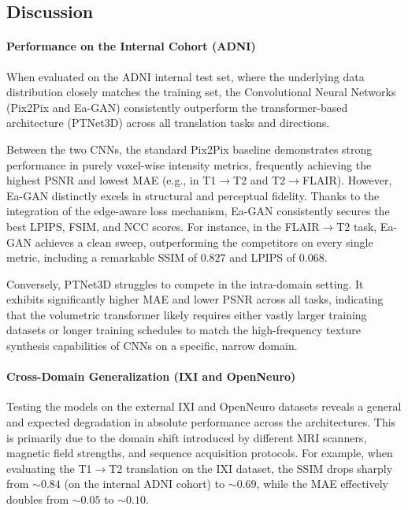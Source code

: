 \documentclass[11pt,a4paper]{article}
\begin{document}
\subsection{Discussion}

\paragraph{Performance on the Internal Cohort (ADNI)}
When evaluated on the ADNI internal test set, where the underlying data distribution closely matches the training set, the Convolutional Neural Networks (Pix2Pix and Ea-GAN) consistently outperform the transformer-based architecture (PTNet3D) across all translation tasks and directions. 

Between the two CNNs, the standard Pix2Pix baseline demonstrates strong performance in purely voxel-wise intensity metrics, frequently achieving the highest PSNR and lowest MAE (e.g., in T1$\rightarrow$T2 and T2$\rightarrow$FLAIR). However, Ea-GAN distinctly excels in structural and perceptual fidelity. Thanks to the integration of the edge-aware loss mechanism, Ea-GAN consistently secures the best LPIPS, FSIM, and NCC scores. For instance, in the FLAIR$\rightarrow$T2 task, Ea-GAN achieves a clean sweep, outperforming the competitors on every single metric, including a remarkable SSIM of $0.827$ and LPIPS of $0.068$. 

Conversely, PTNet3D struggles to compete in the intra-domain setting. It exhibits significantly higher MAE and lower PSNR across all tasks, indicating that the volumetric transformer likely requires either vastly larger training datasets or longer training schedules to match the high-frequency texture synthesis capabilities of CNNs on a specific, narrow domain.

\paragraph{Cross-Domain Generalization (IXI and OpenNeuro)}
Testing the models on the external IXI and OpenNeuro datasets reveals a general and expected degradation in absolute performance across the architectures. This is primarily due to the domain shift introduced by different MRI scanners, magnetic field strengths, and sequence acquisition protocols. For example, when evaluating the T1$\rightarrow$T2 translation on the IXI dataset, the SSIM drops sharply from $\sim 0.84$ (on the internal ADNI cohort) to $\sim 0.69$, while the MAE effectively doubles from $\sim 0.05$ to $\sim 0.10$.
\end{document}
